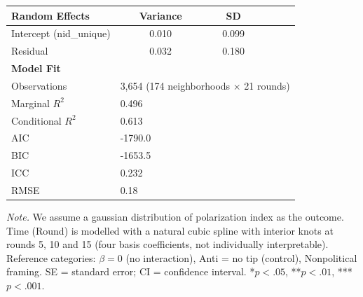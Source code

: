 \begin{table}[H]
\begin{tabularx}{\linewidth}{Xcccc}
\midrule
\textbf{Random Effects} & \textbf{Variance} & \textbf{SD} & & \\
\midrule
Intercept (nid\_unique) & 0.010 & 0.099 & & \\
Residual & 0.032 & 0.180 & & \\

\midrule
\textbf{Model Fit} & & & & \\
\midrule
Observations & \multicolumn{4}{l}{3,654 (174 neighborhoods $\times$ 21 rounds)} \\
Marginal $R^2$ & \multicolumn{4}{l}{0.496} \\
Conditional $R^2$ & \multicolumn{4}{l}{0.613} \\
AIC & \multicolumn{4}{l}{-1790.0} \\
BIC & \multicolumn{4}{l}{-1653.5} \\
ICC & \multicolumn{4}{l}{0.232} \\
RMSE & \multicolumn{4}{l}{0.18} \\

\bottomrule
\end{tabularx}

\vspace{0.6em}
{\footnotesize
\setlength{\baselineskip}{12pt}
\textit{Note.} We assume a gaussian distribution of polarization index as the outcome. Time (Round) is modelled with a natural cubic spline with interior knots at rounds 5, 10 and 15 (four basis coefficients, not individually interpretable). Reference categories: $\beta = 0$ (no interaction), Anti = no tip (control), Nonpolitical framing. SE = standard error; CI = confidence interval. *$p < .05$, **$p < .01$, ***$p < .001$. \par
\par}
\endgroup
\end{table}
